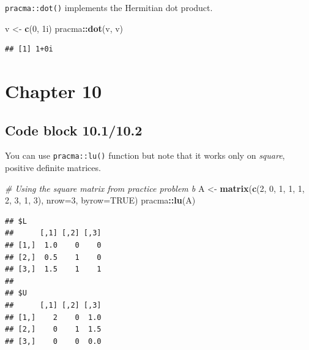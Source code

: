 \documentclass[
]{book}
\newenvironment{Shaded}{\begin{snugshade}}{\end{snugshade}}
\newcommand{\CommentTok}[1]{\textcolor[rgb]{0.56,0.35,0.01}{\textit{#1}}}
\newcommand{\DataTypeTok}[1]{\textcolor[rgb]{0.13,0.29,0.53}{#1}}
\newcommand{\DecValTok}[1]{\textcolor[rgb]{0.00,0.00,0.81}{#1}}
\newcommand{\KeywordTok}[1]{\textcolor[rgb]{0.13,0.29,0.53}{\textbf{#1}}}
\newcommand{\NormalTok}[1]{#1}
\newcommand{\OperatorTok}[1]{\textcolor[rgb]{0.81,0.36,0.00}{\textbf{#1}}}
\newcommand{\OtherTok}[1]{\textcolor[rgb]{0.56,0.35,0.01}{#1}}
\newcommand{\StringTok}[1]{\textcolor[rgb]{0.31,0.60,0.02}{#1}}
\begin{document}
\texttt{pracma::dot()} implements the Hermitian dot product.

\begin{Shaded}
\begin{Highlighting}[]
\NormalTok{v \textless{}{-}}\StringTok{ }\KeywordTok{c}\NormalTok{(}\DecValTok{0}\NormalTok{, 1i)}
\NormalTok{pracma}\OperatorTok{::}\KeywordTok{dot}\NormalTok{(v, v)}
\end{Highlighting}
\end{Shaded}

\begin{verbatim}
## [1] 1+0i
\end{verbatim}

\hypertarget{chapter-10}{%
\section*{Chapter 10}\label{chapter-10}}

\hypertarget{code-block-10.110.2}{%
\subsection*{Code block 10.1/10.2}\label{code-block-10.110.2}}

You can use \texttt{pracma::lu()} function but note that it works only on \emph{square}, positive definite matrices.

\begin{Shaded}
\begin{Highlighting}[]
\CommentTok{\# Using the square matrix from practice problem b}
\NormalTok{A \textless{}{-}}\StringTok{ }\KeywordTok{matrix}\NormalTok{(}\KeywordTok{c}\NormalTok{(}\DecValTok{2}\NormalTok{, }\DecValTok{0}\NormalTok{, }\DecValTok{1}\NormalTok{, }\DecValTok{1}\NormalTok{, }\DecValTok{1}\NormalTok{, }\DecValTok{2}\NormalTok{, }\DecValTok{3}\NormalTok{, }\DecValTok{1}\NormalTok{, }\DecValTok{3}\NormalTok{), }\DataTypeTok{nrow=}\DecValTok{3}\NormalTok{, }\DataTypeTok{byrow=}\OtherTok{TRUE}\NormalTok{)}
\NormalTok{pracma}\OperatorTok{::}\KeywordTok{lu}\NormalTok{(A)}
\end{Highlighting}
\end{Shaded}

\begin{verbatim}
## $L
##      [,1] [,2] [,3]
## [1,]  1.0    0    0
## [2,]  0.5    1    0
## [3,]  1.5    1    1
## 
## $U
##      [,1] [,2] [,3]
## [1,]    2    0  1.0
## [2,]    0    1  1.5
## [3,]    0    0  0.0
\end{verbatim}
\end{document}
